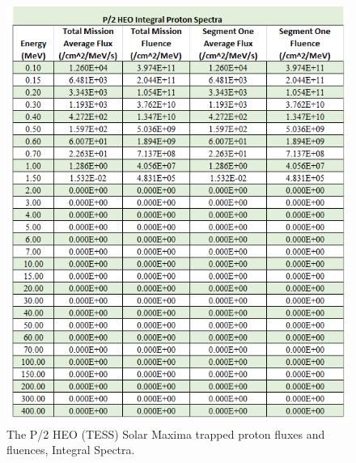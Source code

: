 \documentclass[11pt]{article}
\begin{document}
\begin{figure}[H]
    \centering
    \begin{minipage}{\dimexpr.5\textwidth-1em}
        \centering
        \includegraphics[width=1\linewidth]{HEO_IPS.png}
        \caption{The P/2 HEO (TESS) Solar Maxima trapped proton fluxes and fluences, Integral Spectra.}
        \label{fig:P2HEOIPS}
    \end{minipage}\hfill
    \begin{minipage}{\dimexpr.5\textwidth-1em}
        \centering

\end{minipage}
\end{figure}
\end{document}
